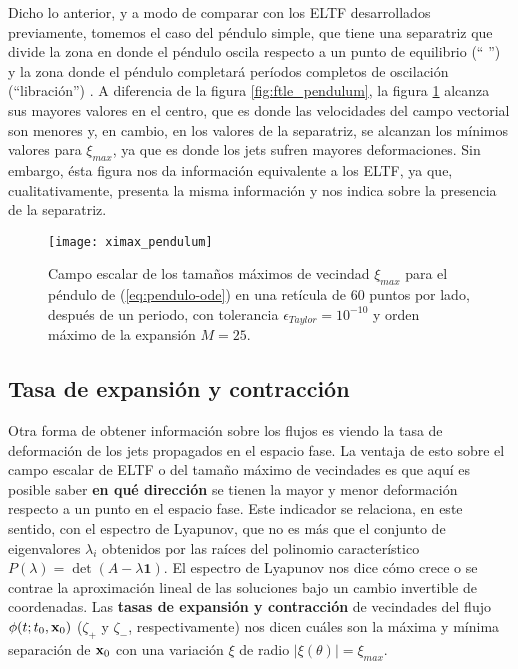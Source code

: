 Dicho lo anterior, y a modo de comparar con los ELTF desarrollados previamente, tomemos el caso del péndulo simple, que tiene una separatriz que divide la zona en donde el péndulo oscila respecto a un punto de equilibrio (`` '') y la zona donde el péndulo completará períodos completos de oscilación (``libración'') . A diferencia de la figura \ref{fig:ftle_pendulum}, la figura \ref{fig:ximax_pendulum} alcanza sus mayores valores en el centro, que es donde las velocidades del campo vectorial son menores y, en cambio, en los valores de la separatriz, se alcanzan los mínimos valores para $\xi_{max}$, ya que es donde los jets sufren mayores deformaciones. Sin embargo, ésta figura nos da información equivalente a los ELTF, ya que, cualitativamente, presenta la misma información y nos indica sobre la presencia de la separatriz. 

\begin{figure}[h!]
 \centering
 \texttt{[image: ximax\_pendulum]}
 \caption{Campo escalar de los tamaños máximos de vecindad $\xi_{max}$ para el péndulo de (\ref{eq:pendulo-ode}) en una retícula de $60$ puntos por lado, después de un periodo, con tolerancia $\epsilon_{Taylor} = 10^{-10}$ y orden máximo de la expansión $M = 25$.}
 \label{fig:ximax_pendulum}
\end{figure}


\subsection{Tasa de expansión y contracción}
\label{sec:contraccion_expansion}

Otra forma de obtener información sobre los flujos es viendo la tasa de deformación de los jets propagados en el espacio fase. La ventaja de esto sobre el campo escalar de ELTF o del tamaño máximo de vecindades es que aquí es posible saber \textbf{en qué dirección} se tienen la mayor y menor deformación respecto a un punto en el espacio fase. Este indicador se relaciona, en este sentido, con el espectro de Lyapunov, que no es más que el conjunto de eigenvalores $\lambda_i$ obtenidos por las raíces del polinomio característico $P(\lambda) = \det(A - \lambda\mathbf{1})$. El espectro de Lyapunov nos dice cómo crece o se contrae la aproximación lineal de las soluciones bajo un cambio invertible de coordenadas. Las \textbf{tasas de expansión y contracción} de vecindades del flujo $\phi(t;t_0,\mathbf{x}_0)$ ($\zeta_+$ y $\zeta_-$, respectivamente) nos dicen cuáles son la máxima y mínima separación de $\mathbf{x}_0$ con una variación $\xi$ de radio $|\xi(\theta)| = \xi_{max}$.

